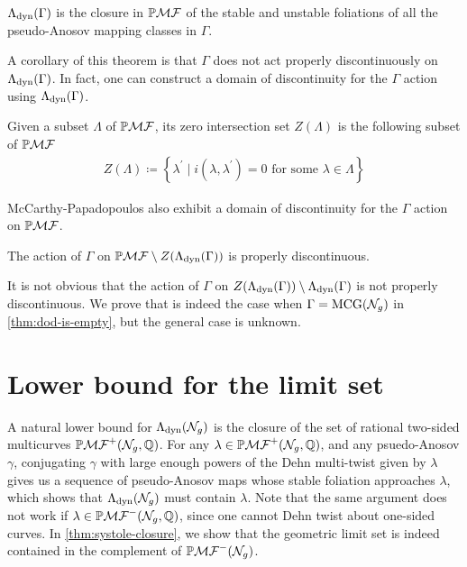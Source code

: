 \documentclass[12pt, reqno]{amsart}
\begin{document}
\begin{theorem}
  $\Lambda_{\mathrm{dyn}}(\Gamma)$ is the closure in $\mathbb{P}\mathcal{MF}$ of the stable and unstable foliations of all the pseudo-Anosov mapping classes in $\Gamma$.
\end{theorem}
A corollary of this theorem is that $\Gamma$ does not act properly discontinuously on $\Lambda_{\mathrm{dyn}}(\Gamma)$.
In fact, one can construct a domain of discontinuity for the $\Gamma$ action using $\Lambda_{\mathrm{dyn}}(\Gamma)$.
\begin{definition}
  Given a subset $\Lambda$ of $\mathbb{P}\mathcal{MF}$, its zero intersection set $Z(\Lambda)$ is the following subset of $\mathbb{P}\mathcal{MF}$
  \begin{align*}
    Z(\Lambda) \coloneqq \left\{ \lambda^{\prime} \mid i(\lambda, \lambda^{\prime}) = 0 \text{ for some $\lambda \in \Lambda$} \right\}
  \end{align*}
\end{definition}

McCarthy-Papadopoulos also exhibit a domain of discontinuity for the $\Gamma$ action on $\mathbb{P}\mathcal{MF}$.
\begin{theorem}
  The action of $\Gamma$ on $\mathbb{P}\mathcal{MF} \setminus Z(\Lambda_{\mathrm{dyn}}(\Gamma))$ is properly discontinuous.
\end{theorem}

It is not obvious that the action of $\Gamma$ on $Z(\Lambda_{\mathrm{dyn}}(\Gamma)) \setminus \Lambda_{\mathrm{dyn}}(\Gamma)$ is not properly discontinuous.
We prove that is indeed the case when $\Gamma = \mathrm{MCG}(\mathcal{N}_g)$ in \autoref{thm:dod-is-empty}, but the general case is unknown.

\section{Lower bound for the limit set}
\label{sec:lower-bound-limit-set}

A natural lower bound for $\Lambda_{\mathrm{dyn}}(\mathcal{N}_g)$ is the closure of the set of rational two-sided multicurves $\mathbb{P}\mathcal{MF}^+(\mathcal{N}_g, \mathbb{Q})$.
For any $\lambda \in \mathbb{P}\mathcal{MF}^+(\mathcal{N}_g, \mathbb{Q})$, and any psuedo-Anosov $\gamma$, conjugating $\gamma$ with large enough powers of the Dehn multi-twist given by $\lambda$ gives us a sequence of pseudo-Anosov maps whose stable foliation approaches $\lambda$, which shows that $\Lambda_{\mathrm{dyn}}(\mathcal{N}_g)$ must contain $\lambda$.
Note that the same argument does not work if $\lambda \in \mathbb{P}\mathcal{MF}^-(\mathcal{N}_g, \mathbb{Q})$, since one cannot Dehn twist about one-sided curves.
In \autoref{thm:systole-closure}, we show that the geometric limit set is indeed contained in the complement of $\mathbb{P}\mathcal{MF}^-(\mathcal{N}_g)$.
\end{document}
